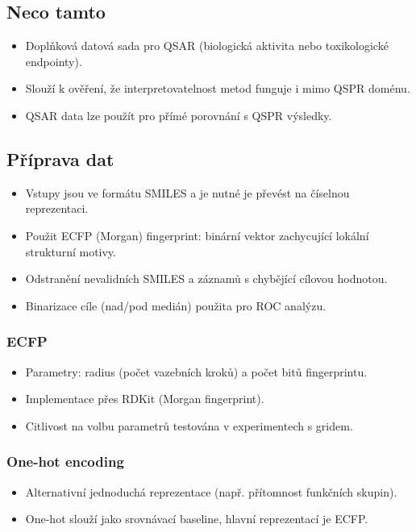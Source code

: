 \documentclass[12pt]{article}
\begin{document}
\subsection{Neco tamto}
\begin{itemize}
  \item Doplňková datová sada pro QSAR (biologická aktivita nebo toxikologické endpointy).
  \item Slouží k ověření, že interpretovatelnost metod funguje i mimo QSPR doménu.
  \item QSAR data lze použít pro přímé porovnání s QSPR výsledky.
\end{itemize}


\subsection{Příprava dat}
\begin{itemize}
  \item Vstupy jsou ve formátu SMILES a je nutné je převést na číselnou reprezentaci.
  \item Použit ECFP (Morgan) fingerprint: binární vektor zachycující lokální strukturní motivy.
  \item Odstranění nevalidních SMILES a záznamů s chybějící cílovou hodnotou.
  \item Binarizace cíle (nad/pod medián) použita pro ROC analýzu.
\end{itemize}

\subsubsection{ECFP}
\begin{itemize}
  \item Parametry: radius (počet vazebních kroků) a počet bitů fingerprintu.
  \item Implementace přes RDKit (Morgan fingerprint).
  \item Citlivost na volbu parametrů testována v experimentech s gridem.
\end{itemize}
\subsubsection{One-hot encoding}
\begin{itemize}
  \item Alternativní jednoduchá reprezentace (např. přítomnost funkčních skupin).
  \item One-hot slouží jako srovnávací baseline, hlavní reprezentací je ECFP.
\end{itemize}
\end{document}
